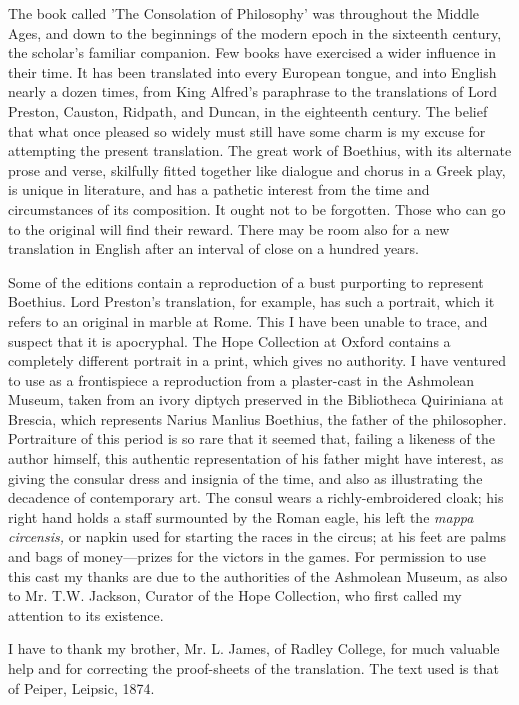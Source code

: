 
The book called 'The Consolation of Philosophy' was throughout the
Middle Ages, and down to the beginnings of the modern epoch in the
sixteenth century, the scholar's familiar companion. Few books have
exercised a wider influence in their time. It has been translated into
every European tongue, and into English nearly a dozen times, from King
Alfred's paraphrase to the translations of Lord Preston, Causton,
Ridpath, and Duncan, in the eighteenth century. The belief that what
once pleased so widely must still have some charm is my excuse for
attempting the present translation. The great work of Boethius, with its
alternate prose and verse, skilfully fitted together like dialogue and
chorus in a Greek play, is unique in literature, and has a pathetic
interest from the time and circumstances of its composition. It ought
not to be forgotten. Those who can go to the original will find their
reward. There may be room also for a new translation in English after an
interval of close on a hundred years.

Some of the editions contain a reproduction of a bust purporting to
represent Boethius. Lord Preston's translation, for example, has such a
portrait, which it refers to an original in marble at Rome. This I have
been unable to trace, and suspect that it is apocryphal. The Hope
Collection at Oxford contains a completely different portrait in a
print, which gives no authority. I have ventured to use as a
frontispiece a reproduction from a plaster-cast in the Ashmolean Museum,
taken from an ivory diptych preserved in the Bibliotheca Quiriniana at
Brescia, which represents Narius Manlius Boethius, the father of the
philosopher. Portraiture of this period is so rare that it seemed that,
failing a likeness of the author himself, this authentic representation
of his father might have interest, as giving the consular dress and
insignia of the time, and also as illustrating the decadence of
contemporary art. The consul wears a richly-embroidered cloak; his right
hand holds a staff surmounted by the Roman eagle, his left the \emph{mappa
circensis,} or napkin used for starting the races in the circus; at his
feet are palms and bags of money—prizes for the victors in the games.
For permission to use this cast my thanks are due to the authorities of
the Ashmolean Museum, as also to Mr. T.W. Jackson, Curator of the Hope
Collection, who first called my attention to its existence.

I have to thank my brother, Mr. L. James, of Radley College, for much
valuable help and for correcting the proof-sheets of the translation.
The text used is that of Peiper, Leipsic, 1874.

